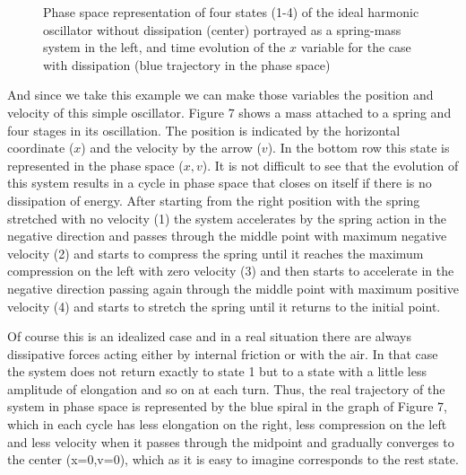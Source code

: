 \documentclass{article}
\begin{document}
\begin{figure}
    \centering
    \caption{Phase space representation of four states (1-4) of the ideal harmonic oscillator without dissipation (center) portrayed as a spring-mass system in the left, and time evolution of the $x$ variable for the case with dissipation (blue trajectory in the phase space)} 
    \label{fig_harmosc}
\end{figure}

And since we take this example we can make those variables the position and velocity of this simple oscillator. 
Figure 7 shows a mass attached to a spring and four stages in its oscillation. 
The position is indicated by the horizontal coordinate ($x$) and the velocity by the arrow ($v$). In the bottom row this state is represented in the phase space ($x,v$).
It is not difficult to see that the evolution of this system results in a cycle in phase space that closes on itself if there is no dissipation of energy. 
After starting from the right position with the spring stretched with no velocity (1) the system accelerates by the spring action in the negative direction and passes through the middle point with maximum negative velocity (2) and starts to compress the spring until it reaches the maximum compression on the left with zero velocity (3) and then starts to accelerate in the negative direction passing again through the middle point with maximum positive velocity (4) and starts to stretch the spring until it returns to the initial point.  



Of course this is an idealized case and in a real situation there are always dissipative forces acting either by internal friction or with the air. 
In that case the system does not return exactly to state 1 but to a state with a little less amplitude of elongation and so on at each turn. 
Thus, the real trajectory of the system in phase space is represented by the blue spiral in the graph of Figure 7, which in each cycle has less elongation on the right, less compression on the left and less velocity when it passes through the midpoint and gradually converges to the center (x=0,v=0), which as it is easy to imagine corresponds to the rest state.  
\end{document}
